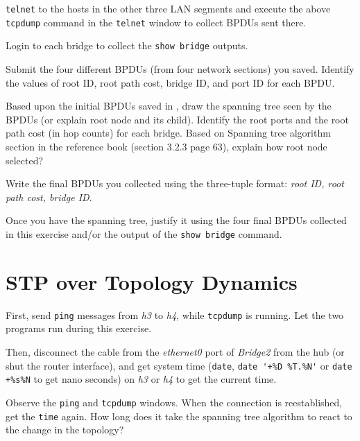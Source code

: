 \documentclass{../UTNetLab}
\begin{document}
    \lstinline{telnet} to the hosts in the other three LAN segments and execute the above \lstinline{tcpdump} command in the \lstinline{telnet} window to collect BPDUs sent there.

    Login to each bridge to collect the \lstinline[language={cisco}]{show bridge} outputs.
    
    \begin{report}
    \item Submit the four different BPDUs (from four network sections) you saved.
    Identify the values of root ID, root path cost, bridge ID, and port ID for each BPDU.

    \item Based upon the initial BPDUs saved in , draw the spanning tree seen by the BPDUs (or explain root node and its child).
    Identify the root ports and the root path cost (in hop counts) for each bridge.
    Based on Spanning tree algorithm section in the reference book (section 3.2.3 page 63), explain how root node selected?

    \item Write the final BPDUs you collected using the three-tuple format: \textit{{root ID, root path cost, bridge ID}}.

    \item Once you have the spanning tree, justify it using the four final BPDUs collected in this exercise and/or the output of the \lstinline[language={cisco}]{show bridge} command.
    \end{report}


\section{STP over Topology Dynamics}
    First, send \lstinline{ping} messages from \textit{h3} to \textit{h4}, while \lstinline{tcpdump} is running.
    Let the two programs run during this exercise.

    Then, disconnect the cable from the \textit{ethernet0} port of \textit{Bridge2} from the hub (or shut the router interface), and get system time (\lstinline{date}, \lstinline{date '+%D %T.%N'} or \lstinline{date +%s%N} to get nano seconds) on \textit{h3} or \textit{h4} to get the current time.

    Observe the \lstinline{ping} and \lstinline{tcpdump} windows. When the connection is reestablished, get the \lstinline{time} again. How long does it take the spanning tree algorithm to react to the change in the topology?
\end{document}
